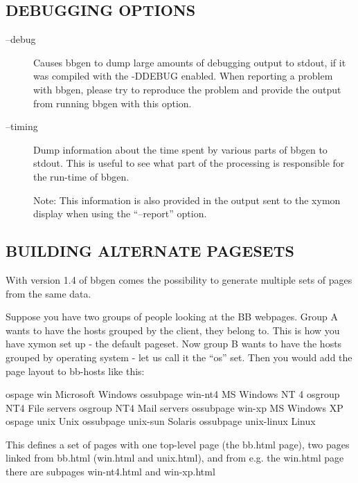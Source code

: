 \subsection{DEBUGGING OPTIONS}


 \begin{description}
\item[--debug] Causes bbgen to dump large amounts of debugging output
  to stdout, if it was compiled with the -DDEBUG enabled. When
  reporting a problem with bbgen, please try to reproduce the problem
  and provide the output from running bbgen with this option. 


 

\item[--timing] Dump information about the time spent by various parts
  of bbgen to stdout. This is useful to see what part of the
  processing is responsible for the run-time of bbgen.  

 Note: This information is also provided in the output sent to the xymon display when using the ``--report'' option. 

 


 


\end{description}

\subsection{BUILDING ALTERNATE PAGESETS}
 With version 1.4 of bbgen comes the possibility to generate multiple
 sets of pages from the same data.  

 Suppose you have two groups of people looking at the BB
 webpages. Group A wants to have the hosts grouped by the client, they
 belong to. This is how you have xymon set up - the default
 pageset. Now group B wants to have the hosts grouped by operating
 system - let us call it the ``os'' set. Then you would add the page
 layout to bb-hosts like this: 


 ospage win Microsoft Windows  
 ossubpage win-nt4 MS Windows NT 4  
 osgroup NT4 File servers  
 osgroup NT4 Mail servers  
 ossubpage win-xp MS Windows XP  
 ospage unix Unix  
 ossubpage unix-sun Solaris  
 ossubpage unix-linux Linux 


  This defines a set of pages with one top-level page (the bb.html
  page), two pages linked from bb.html (win.html and unix.html), and
  from e.g. the win.html page there are subpages win-nt4.html and
  win-xp.html  


